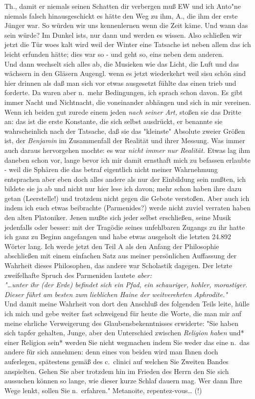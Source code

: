 \documentclass[
]{article}
\begin{document}
Th., damit er niemals seinen Schatten dir verbergen muß EW und ich
Anto"ne niemals falsch hinausgeschickt es hätte den Weg zu ihm, A., die
ihm der erste Jünger war. So würden wir uns kennenlernen wenn die Zeit
käme. Und wann das sein würde? Im Dunkel ist\textquotesingle s, nur dann
und werden es wissen. Also schließen wir jetzt die Tür woes kalt wird
weil der Winter eine Tatsache ist neben allem das ich leicht erfunden
hätte; dies war so - und geht so, eins neben dem anderen.\\
Und dann wechselt sich alles ab, die Musieken wie das Licht, die Luft
und das wächsern in den Gläsern Augengl. wenn es jetzt wiederkehrt weil
sisu schön sind hier drinnen als daß man sich vor etwas ausgesetzt
fühlte das einen trieb und forderte. Da waren aber n.~mehr Bedingungen,
ich sprach schon davon. Es gibt immer Nacht und Nichtnacht, die
voneinander abhängen und sich in mir vereinen. Wenn ich beiden gut
zurede einem jeden \emph{nach seiner Art,} stoßen sie das Dritte an: das
ist die erste Konstante, die sich selbst ausdrückt, er benannte sie
wahrscheinlich nach der Tatsache, daß sie das "kleinste" Absolute zweier
Größen ist, der \emph{Benjamin} im Zusammenfall der Realität und ihrer
Messung. Was immer auch daraus hervorgehen mochte: es war \emph{nicht
immer nur Realität.} Etwas lag ihm daneben schon vor, lange bevor ich
mir damit ernsthaft mich zu befassen erlaubte - weil die Sphären die das
betraf eigentlich nicht meiner Wahrnehmung entsprachen aber eben doch
alles andere als nur der Einbildung sein mußten, ich bildete sie ja ab
und nicht nur hier lese ich davon; mehr schon haben ihre dazu getan
(Leerstelle!) und trotzdem nicht gegen die Gebote verstoßen. Aber auch
ich indem ich euch etwas beibrachte (Parmenides?) werde nicht zuviel
verraten haben den alten Platoniker. Jenen mußte sich jeder selbst
erschließen, seine Musik jedenfalls oder besser: mit der Tragödie seines
unfehlbaren Zugangs zu ihr hatte ich ganz zu Beginn angefangen und habe
etwas ausgeholt die letzten 24.892 Wörter lang. Ich werde jetzt den Teil
A als den Anfang der Philosophie abschließen mit einem einfachen Satz
aus meiner persönlichen Auffassung der Wahrheit dieses Philosophen, das
andere war Scholastik dagegen. Der letzte zweifelhafte Spruch des
Parmeniden lautete \emph{aber:}\\
\emph{"\ldots unter ihr (der Erde) befindet sich ein Pfad, ein
schauriger, hohler, morastiger. Dieser führt am besten zum lieblichen
Haine der weitverehrten Aphrodite." }\\
Und damit meine Wahrheit von dort den Anschluß des folgenden Teils
leite, hülle ich mich und gebe weiter fast schweigend für heute die
Worte, die man mir auf meine ehrliche Verweigerung des
Glaubensbekenntnisses erwiderte: "Sie haben sich tapfer gehalten, Junge,
aber den Unterschied zwischen \emph{Religion haben }und* einer Religion
sein* werden Sie nicht wegmachen indem Sie weder das eine n.~das andere
für sich annehmen: denn eines von beiden wird man Ihnen doch auferlegen,
spätestens gemäß des c.~clinici auf welchen Sie Zweiten Bandes
anspielten. Gehen Sie aber trotzdem hin im Frieden des Herrn den Sie
sich aussuchen können so lange, wie dieser kurze Schlaf dauern mag. Wer
dann Ihre Wege lenkt, sollen Sie n.~erfahren." Metanoite,
repentez-vous\ldots{} (!)
\end{document}
